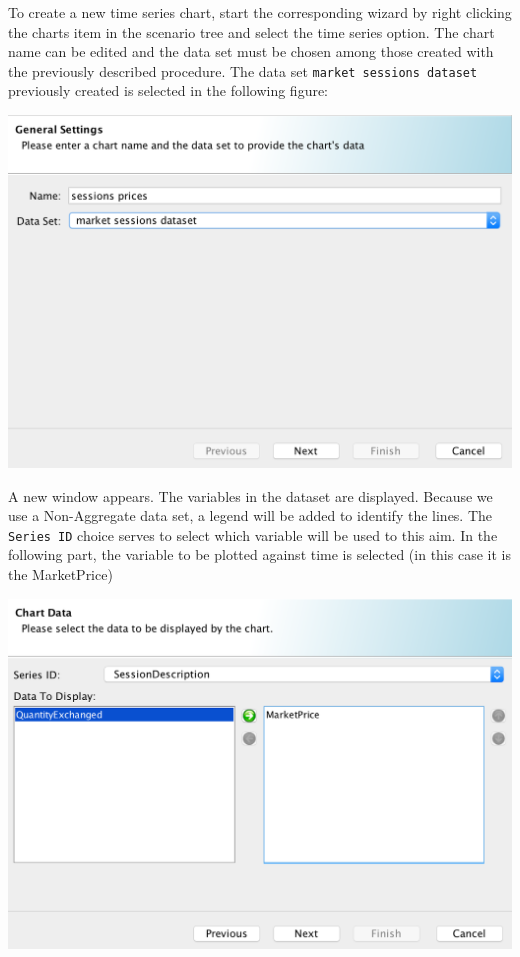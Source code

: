 \documentclass{article}
\begin{document}
To create a new time series chart, start the corresponding wizard by right clicking the charts item in the scenario tree and select the time series option.
The chart name can be edited and the data set must be chosen among those created with the previously described procedure. The data set \verb+market sessions dataset+ previously created is selected in the following figure: 

\includegraphics[scale=0.35]{fig_cms_rs_chart1}

A new window appears. The variables in the dataset are displayed. Because we use a Non-Aggregate data set, a legend will be added to identify the lines. The \verb+Series ID+ choice serves to select which variable will be used to this aim. In the following part, the variable to be plotted against time is selected (in this case it is the MarketPrice) 

\includegraphics[scale=0.35]{fig_cms_rs_chart2}
\end{document}
